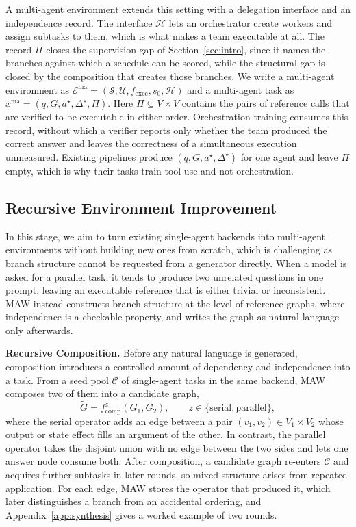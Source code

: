 A multi-agent environment extends this setting with a delegation interface and an independence record.
The interface $\mathcal{H}$ lets an orchestrator create workers and assign subtasks to them, which is what makes a team executable at all.
The record $\Pi$ closes the supervision gap of Section~\ref{sec:intro}, since it names the branches against which a schedule can be scored, while the structural gap is closed by the composition that creates those branches.
We write a multi-agent environment as $\mathcal{E}^{\mathrm{ma}}=(\mathcal{S},\mathcal{U},f_{\mathrm{exec}},s_0,\mathcal{H})$ and a multi-agent task as $x^{\mathrm{ma}}=(q,G,a^{\star},\Delta^{\star},\Pi)$.
Here $\Pi\subseteq V\times V$ contains the pairs of reference calls that are verified to be executable in either order.
Orchestration training consumes this record, without which a verifier reports only whether the team produced the correct answer and leaves the correctness of a simultaneous execution unmeasured.
Existing pipelines produce $(q,G,a^{\star},\Delta^{\star})$ for one agent and leave $\Pi$ empty, which is why their tasks train tool use and not orchestration.

\subsection{Recursive Environment Improvement}
\label{sec:synthesis}

In this stage, we aim to turn existing single-agent backends into multi-agent environments without building new ones from scratch, which is challenging as branch structure cannot be requested from a generator directly.
When a model is asked for a parallel task, it tends to produce two unrelated questions in one prompt, leaving an executable reference that is either trivial or inconsistent.
MAW instead constructs branch structure at the level of reference graphs, where independence is a checkable property, and writes the graph as natural language only afterwards.

\textbf{Recursive Composition.}\quad
Before any natural language is generated, composition introduces a controlled amount of dependency and independence into a task.
From a seed pool $\mathcal{C}$ of single-agent tasks in the same backend, MAW composes two of them into a candidate graph,
\begin{equation}
\tilde{G}=f_{\mathrm{comp}}^{z}(G_1,G_2),\qquad z\in\{\mathrm{serial},\mathrm{parallel}\},
\label{eq:compose}
\end{equation}
where the serial operator adds an edge between a pair $(v_1,v_2)\in V_1\times V_2$ whose output or state effect fills an argument of the other.
In contrast, the parallel operator takes the disjoint union with no edge between the two sides and lets one answer node consume both.
After composition, a candidate graph re-enters $\mathcal{C}$ and acquires further subtasks in later rounds, so mixed structure arises from repeated application.
For each edge, MAW stores the operator that produced it, which later distinguishes a branch from an accidental ordering, and Appendix~\ref{app:synthesis} gives a worked example of two rounds.


